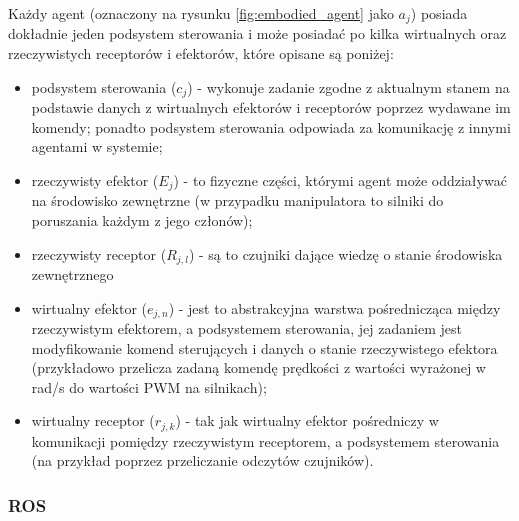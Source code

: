 \documentclass[a4paper, 12pt, twoside]{article}
\begin{document}
Każdy agent (oznaczony na rysunku \ref{fig:embodied_agent} jako $a_j$) posiada dokładnie jeden podsystem sterowania i może posiadać po kilka wirtualnych oraz rzeczywistych receptorów i efektorów, które opisane są poniżej:

\begin{itemize}
\item podsystem sterowania ($c_j$) - wykonuje zadanie zgodne z aktualnym stanem na podstawie danych z wirtualnych efektorów i receptorów poprzez wydawane im komendy; ponadto podsystem sterowania odpowiada za komunikację z innymi agentami w systemie;
\item rzeczywisty efektor ($E_j$) - to fizyczne części, którymi agent może oddziaływać na środowisko zewnętrzne (w przypadku manipulatora to silniki do poruszania każdym z jego członów);
\item rzeczywisty receptor ($R_{j,l}$) - są to czujniki dające wiedzę o stanie środowiska zewnętrznego
\item wirtualny efektor ($e_{j,n}$) - jest to abstrakcyjna warstwa pośrednicząca między rzeczywistym efektorem, a podsystemem sterowania, jej zadaniem jest modyfikowanie komend sterujących i danych o stanie rzeczywistego efektora (przykładowo przelicza zadaną komendę prędkości z wartości wyrażonej w rad/s do wartości PWM na silnikach);
\item wirtualny receptor ($r_{j,k}$) - tak jak wirtualny efektor pośredniczy w komunikacji pomiędzy rzeczywistym receptorem, a podsystemem sterowania (na przykład poprzez przeliczanie odczytów czujników).
\end{itemize}

\subsubsection{ROS}
\end{document}
